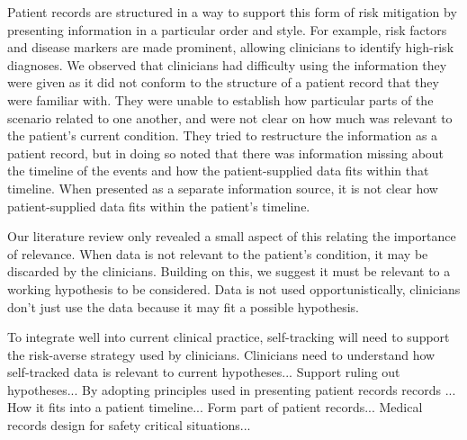 \documentclass{sigchi}
\begin{document}
Patient records are structured in a way to support this form of risk mitigation by presenting information in a particular order and style. For example, risk factors and disease markers are made prominent, allowing clinicians to identify high-risk diagnoses. We observed that clinicians had difficulty using the information they were given as it did not conform to the structure of a patient record that they were familiar with. They were unable to establish how particular parts of the scenario related to one another, and were not clear on how much was relevant to the patient's current condition. They tried to restructure the information as a patient record, but in doing so noted that there was information missing about the timeline of the events and how the patient-supplied data fits within that timeline. When presented as a separate information source, it is not clear how patient-supplied data fits within the patient's timeline.

Our literature review only revealed a small aspect of this relating the importance of relevance. When data is not relevant to the patient's condition, it may be discarded by the clinicians. Building on this, we suggest it must be relevant to a working hypothesis to be considered. Data is not used opportunistically, clinicians don't just use the data because it may fit a possible hypothesis. 

To integrate well into current clinical practice, self-tracking will need to support the risk-averse strategy used by clinicians. Clinicians need to understand how self-tracked data is relevant to current hypotheses... Support ruling out hypotheses... By adopting principles used in presenting patient records records ... How it fits into a patient timeline... Form part of patient records... Medical records design for safety critical situations...




\end{document}
